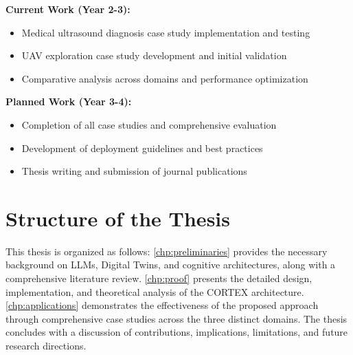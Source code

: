 \textbf{Current Work (Year 2-3):}
\begin{itemize}
    \item Medical ultrasound diagnosis case study implementation and testing
    \item UAV exploration case study development and initial validation
    \item Comparative analysis across domains and performance optimization
\end{itemize}

\textbf{Planned Work (Year 3-4):}
\begin{itemize}
    \item Completion of all case studies and comprehensive evaluation
    \item Development of deployment guidelines and best practices
    \item Thesis writing and submission of journal publications
\end{itemize}

\section{Structure of the Thesis}

This thesis is organized as follows: \autoref{chp:preliminaries} provides the necessary background on LLMs, Digital Twins, and cognitive architectures, along with a comprehensive literature review. \autoref{chp:proof} presents the detailed design, implementation, and theoretical analysis of the CORTEX architecture. \autoref{chp:applications} demonstrates the effectiveness of the proposed approach through comprehensive case studies across the three distinct domains. The thesis concludes with a discussion of contributions, implications, limitations, and future research directions.
